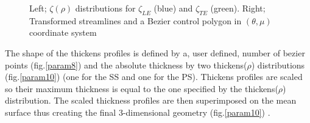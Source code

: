 \begin{figure}[h!]
\begin{minipage}[b]{0.5\linewidth}
 \centering
\end{minipage}
\begin{minipage}[b]{0.5\linewidth}
 \centering
\end{minipage}
\caption{Left; $\zeta(\rho)$ distributions for $\zeta_{LE}$  (blue) and $\zeta_{TE}$ (green). Right; Transformed streamlines and a Bezier control polygon in $(\theta,\mu)$ coordinate system}
\label{param7}
\end{figure}

The shape of the thickens profiles is defined by a, user defined, number of bezier points (fig.\ref{param8}) and the absolute thickness by two thickens($\rho$) distributions (fig.\ref{param10}) (one for the SS and one for the PS). Thickens profiles are scaled so their maximum thickness is equal to the one specified by the thickens($\rho$) distribution. The scaled thickness profiles are then superimposed on the mean surface thus creating the final 3-dimensional geometry (fig.\ref{param10}) . 

